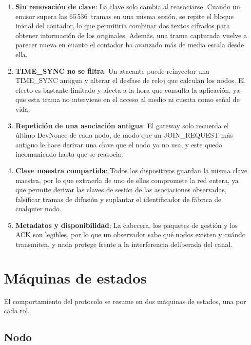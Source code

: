 \begin{enumerate}
\item \textbf{Sin renovación de clave}: La clave solo cambia al reasociarse. Cuando un emisor supera las 65\,536~tramas en una misma sesión, se repite el bloque inicial del contador, lo que permitiría combinar dos textos cifrados para obtener información de los originales. Además, una trama capturada vuelve a parecer nueva en cuanto el contador ha avanzado más de media escala desde ella. 

\item \textbf{TIME\_SYNC no se filtra}: Un atacante puede reinyectar una TIME\_SYNC antigua y alterar el desfase de reloj que calculan los nodos. El efecto es bastante limitado y afecta a la hora que consulta la aplicación, ya que esta trama no interviene en el acceso al medio ni cuenta como señal de vida.

\item \textbf{Repetición de una asociación antigua}: El gateway solo recuerda el último DevNonce de cada nodo, de modo que un JOIN\_REQUEST más antiguo le hace derivar una clave que el nodo ya no usa, y este queda incomunicado hasta que se reasocia.

\item \textbf{Clave maestra compartida}: Todos los dispositivos guardan la misma clave maestra, por lo que extraerla de uno de ellos compromete la red entera, ya que permite derivar las claves de sesión de las asociaciones observadas, falsificar tramas de difusión y suplantar el identificador de fábrica de cualquier nodo. 

\item \textbf{Metadatos y disponibilidad}: La cabecera, los paquetes de gestión y los ACK son legibles, por lo que un observador sabe qué nodos existen y cuándo transmiten, y nada protege frente a la interferencia deliberada del canal.
\end{enumerate}

\section{Máquinas de estados}

El comportamiento del protocolo se resume en dos máquinas de estados, una por cada rol.

\subsection{Nodo}

